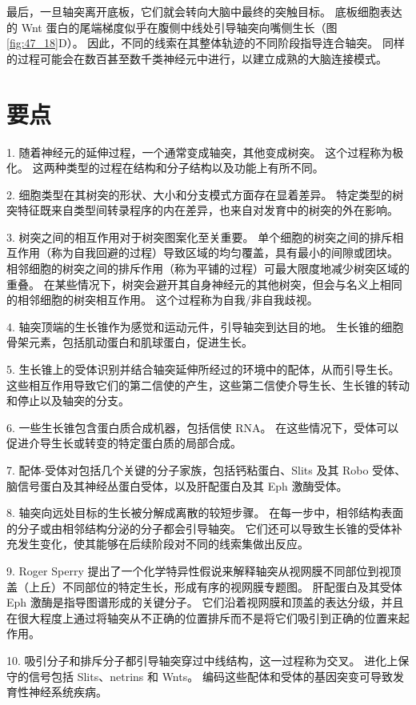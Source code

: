 最后，一旦轴突离开底板，它们就会转向大脑中最终的突触目标。 底板细胞表达的 Wnt 蛋白的尾端梯度似乎在腹侧中线处引导轴突向嘴侧生长（图 \ref{fig:47_18}D）。 因此，不同的线索在其整体轨迹的不同阶段指导连合轴突。 同样的过程可能会在数百甚至数千类神经元中进行，以建立成熟的大脑连接模式。


\section{要点}
1. 随着神经元的延伸过程，一个通常变成轴突，其他变成树突。 这个过程称为极化。 这两种类型的过程在结构和分子结构以及功能上有所不同。 

2. 细胞类型在其树突的形状、大小和分支模式方面存在显着差异。 特定类型的树突特征既来自类型间转录程序的内在差异，也来自对发育中的树突的外在影响。 

3. 树突之间的相互作用对于树突图案化至关重要。 单个细胞的树突之间的排斥相互作用（称为自我回避的过程）导致区域的均匀覆盖，具有最小的间隙或团块。 相邻细胞的树突之间的排斥作用（称为平铺的过程）可最大限度地减少树突区域的重叠。 在某些情况下，树突会避开其自身神经元的其他树突，但会与名义上相同的相邻细胞的树突相互作用。 这个过程称为自我/非自我歧视。 

4. 轴突顶端的生长锥作为感觉和运动元件，引导轴突到达目的地。 生长锥的细胞骨架元素，包括肌动蛋白和肌球蛋白，促进生长。 

5. 生长锥上的受体识别并结合轴突延伸所经过的环境中的配体，从而引导生长。 这些相互作用导致它们的第二信使的产生，这些第二信使介导生长、生长锥的转动和停止以及轴突的分支。 

6. 一些生长锥包含蛋白质合成机器，包括信使 RNA。 在这些情况下，受体可以促进介导生长或转变的特定蛋白质的局部合成。 

7. 配体-受体对包括几个关键的分子家族，包括钙粘蛋白、Slits 及其 Robo 受体、脑信号蛋白及其神经丛蛋白受体，以及肝配蛋白及其 Eph 激酶受体。 

8. 轴突向远处目标的生长被分解成离散的较短步骤。 在每一步中，相邻结构表面的分子或由相邻结构分泌的分子都会引导轴突。 它们还可以导致生长锥的受体补充发生变化，使其能够在后续阶段对不同的线索集做出反应。 

9. Roger Sperry 提出了一个化学特异性假说来解释轴突从视网膜不同部位到视顶盖（上丘）不同部位的特定生长，形成有序的视网膜专题图。 肝配蛋白及其受体 Eph 激酶是指导图谱形成的关键分子。 它们沿着视网膜和顶盖的表达分级，并且在很大程度上通过将轴突从不正确的位置排斥而不是将它们吸引到正确的位置来起作用。 

10. 吸引分子和排斥分子都引导轴突穿过中线结构，这一过程称为交叉。 进化上保守的信号包括 Slits、netrins 和 Wnts。 编码这些配体和受体的基因突变可导致发育性神经系统疾病。

